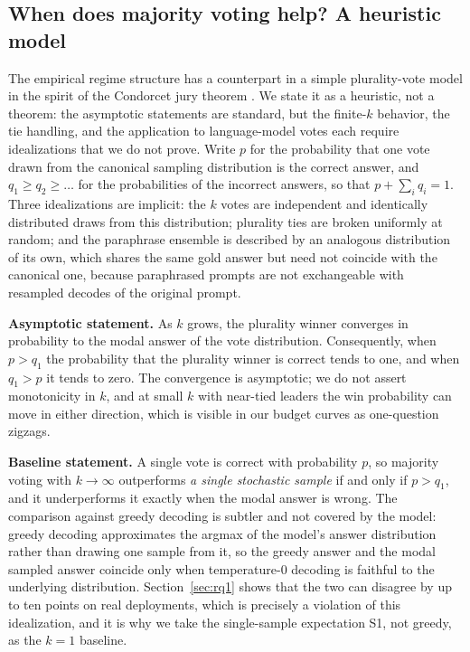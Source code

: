 \subsection{When does majority voting help? A heuristic model}
\label{sec:condorcet}

The empirical regime structure has a counterpart in a simple plurality-vote model in the spirit of the Condorcet jury theorem \citep{condorcet1785essai}. We state it as a heuristic, not a theorem: the asymptotic statements are standard, but the finite-$k$ behavior, the tie handling, and the application to language-model votes each require idealizations that we do not prove. Write $p$ for the probability that one vote drawn from the canonical sampling distribution is the correct answer, and $q_1 \ge q_2 \ge \dots$ for the probabilities of the incorrect answers, so that $p + \sum_i q_i = 1$. Three idealizations are implicit: the $k$ votes are independent and identically distributed draws from this distribution; plurality ties are broken uniformly at random; and the paraphrase ensemble is described by an analogous distribution of its own, which shares the same gold answer but need not coincide with the canonical one, because paraphrased prompts are not exchangeable with resampled decodes of the original prompt.

\textbf{Asymptotic statement.} As $k$ grows, the plurality winner converges in probability to the modal answer of the vote distribution. Consequently, when $p > q_1$ the probability that the plurality winner is correct tends to one, and when $q_1 > p$ it tends to zero. The convergence is asymptotic; we do not assert monotonicity in $k$, and at small $k$ with near-tied leaders the win probability can move in either direction, which is visible in our budget curves as one-question zigzags.

\textbf{Baseline statement.} A single vote is correct with probability $p$, so majority voting with $k \to \infty$ outperforms \emph{a single stochastic sample} if and only if $p > q_1$, and it underperforms it exactly when the modal answer is wrong. The comparison against greedy decoding is subtler and not covered by the model: greedy decoding approximates the argmax of the model's answer distribution rather than drawing one sample from it, so the greedy answer and the modal sampled answer coincide only when temperature-$0$ decoding is faithful to the underlying distribution. Section~\ref{sec:rq1} shows that the two can disagree by up to ten points on real deployments, which is precisely a violation of this idealization, and it is why we take the single-sample expectation S1, not greedy, as the $k{=}1$ baseline.

